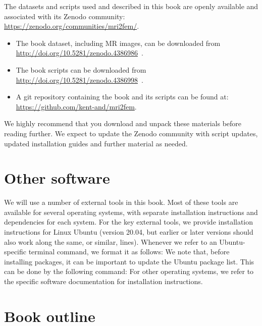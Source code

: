 
The datasets and scripts used and described in this book are openly
available and associated with its Zenodo community: \\
\url{https://zenodo.org/communities/mri2fem/}. 
\begin{itemize}
\item
  The book dataset, including MR images, can be downloaded from \\
  \url{http://doi.org/10.5281/zenodo.4386986}~\cite{kent_andre_mardal_2020_4386986}.
\item
  The book scripts can be downloaded from \\
  \url{http://doi.org/10.5281/zenodo.4386998}~\cite{kent_andre_mardal_2020_4386998}.
\item 
  A git repository containing the book and its scripts can be found 
  at: \\ \url{https://github.com/kent-and/mri2fem}.
\end{itemize}
We highly recommend that you download and unpack these materials
before reading further. We expect to update the Zenodo community with
script updates, updated installation guides and further material as
needed.
 
\section{Other software}
We will use a number of external tools in this book. Most of these
tools are available for several operating systems, with separate
installation instructions and dependencies for each system. For the
key external tools, we provide installation instructions for Linux
Ubuntu (version 20.04, but earlier or later versions should also work
along the same, or similar, lines). Whenever we refer to an Ubuntu-specific 
terminal command, we format it as follows:
\noindent We note that, before installing packages, it can be important to update
the Ubuntu package list. This can be done by the following command:
\noindent For other operating systems, we refer to the specific
software documentation for installation instructions.

\section{Book outline}

